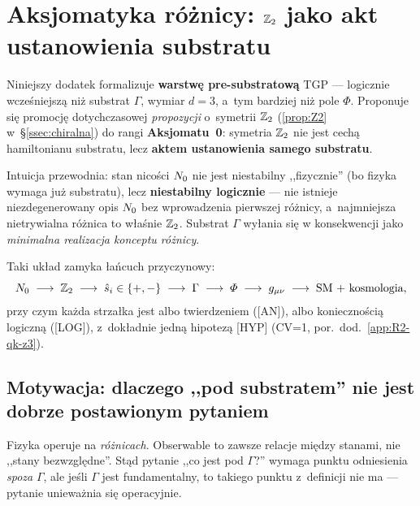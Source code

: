 \section{Aksjomatyka r\'o\.znicy: $\mathbb{Z}_2$ jako akt ustanowienia substratu}%
\label{app:aksjomatyka-roznicy}

Niniejszy dodatek formalizuje \textbf{warstw\k{e} pre-substratow\k{a}}
TGP --- logicznie wcze\'sniejsz\k{a} ni\.z substrat $\Gamma$, wymiar
$d=3$, a~tym bardziej ni\.z pole $\Phi$. Proponuje si\k{e} promocj\k{e}
dotychczasowej \emph{propozycji} o~symetrii $\mathbb{Z}_2$
(\ref{prop:Z2} w~\S\ref{ssec:chiralna}) do rangi \textbf{Aksjomatu~0}:
symetria $\mathbb{Z}_2$ nie jest cech\k{a} hamiltonianu substratu, lecz
\textbf{aktem ustanowienia samego substratu}.

Intuicja przewodnia: stan nicości $N_0$ nie jest
niestabilny ,,fizycznie'' (bo fizyka wymaga ju\.z substratu), lecz
\textbf{niestabilny logicznie} --- nie istnieje niezdegenerowany
opis $N_0$ bez wprowadzenia pierwszej r\'o\.znicy, a~najmniejsza
nietrywialna r\'o\.znica to w\l{}a\'snie $\mathbb{Z}_2$. Substrat $\Gamma$
wy\l{}ania si\k{e} w konsekwencji jako \emph{minimalna realizacja
konceptu r\'o\.znicy}.

Taki uk\l{}ad zamyka \l{}a\'ncuch przyczynowy:
\[
  N_0 \;\longrightarrow\; \mathbb{Z}_2
  \;\longrightarrow\; \hat{s}_i \in \{+,-\}
  \;\longrightarrow\; \Gamma
  \;\longrightarrow\; \varPhi
  \;\longrightarrow\; g_{\mu\nu}
  \;\longrightarrow\; \text{SM + kosmologia},
\]
przy czym ka\.zda strza\l{}ka jest albo twierdzeniem ([AN]), albo
konieczno\'sci\k{a} logiczn\k{a} ([LOG]), z~dok\l{}adnie jedn\k{a}
hipotez\k{a} [HYP] (CV=1, por.\ dod.~\ref{app:R2-qk-z3}).

\subsection{Motywacja: dlaczego ,,pod substratem'' nie jest dobrze
            postawionym pytaniem}%
\label{app:0-motywacja}

Fizyka operuje na \emph{r\'o\.znicach}. Obserwable to zawsze relacje
mi\k{e}dzy stanami, nie ,,stany bezwzgl\k{e}dne''. St\k{a}d pytanie
,,co jest pod $\Gamma$?'' wymaga punktu odniesienia
\emph{spoza} $\Gamma$, ale je\'sli $\Gamma$ jest fundamentalny, to
takiego punktu z~definicji nie ma --- pytanie unieważnia si\k{e}
operacyjnie.

